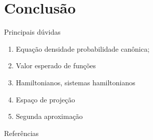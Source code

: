 \section{Conclusão} %

\begin{frame}{Principais dúvidas}
    \begin{enumerate}
        \item Equação densidade probabilidade canônica;
        \item Valor esperado de funções
        \item Hamiltonianos, sistemas hamiltonianos
        \item Espaço de projeção
        \item Segunda aproximação
    \end{enumerate}
\end{frame}
\begin{frame}{Referências}
    \nocite{*}
    \printbibliography[heading=none]
\end{frame}